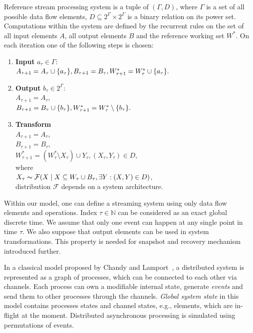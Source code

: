 \begin{definition}{Reference stream processing system}
\label{reference_system}
is a tuple of $(\Gamma,D)$, where $\Gamma$ is a set of all possible data flow elements, $D\subseteq{2^{\Gamma}\times2^{\Gamma}}$ is a binary relation on its power set. Computations within the system are defined by the recurrent rules on the set of all input elements $A$, all output elements $B$ and the reference working set $W^{*}$. On each iteration one of the following steps is chosen:

\begin{enumerate}
    \item \textbf{Input} $a_\tau\in{\Gamma}$:\\ $A_{\tau+1}=A_\tau \cup \{a_\tau\}, \\ B_{\tau+1}=B_{\tau}, \\ W^{*}_{\tau+1}=W^{*}_{\tau} \cup \{a_\tau\}.$
    \item \textbf{Output} $b_\tau\in{2^\Gamma}$:\\ $A_{\tau + 1} = A_{\tau}$, \\ $B_{\tau+1}=B_\tau \cup \{b_\tau\}, \\ W^{*}_{\tau+1}=W^{*}_{\tau} \setminus \{b_\tau\}.$
    \item \textbf{Transform}\\ $A_{\tau + 1} = A_{\tau}$,\\ $B_{\tau+1}=B_{\tau}$, \\ $W^{*}_{\tau+1}=(W^{*}_\tau \setminus X_\tau) \cup Y_\tau, (X_\tau,Y_\tau) \in D$, \\where\\$X_\tau \thicksim \mathcal{F}(X\mid X \subseteq W_\tau \cup B_\tau , \exists Y : (X,Y) \in D)$, \\ distribution $\mathcal{F}$ depends on a system architecture. \label{random_formula}
\end{enumerate}

\end{definition}

Within our model, one can define a streaming system using only data flow elements and operations. Index $\tau\in{\mathbb{N}}$ can be considered as an exact global discrete time. We assume that only one event can happen at any single point in time $\tau$. We also suppose that output elements can be used in system transformations. This property is needed for snapshot and recovery mechanism introduced further. 

In a classical model proposed by Chandy and Lamport~\cite{Chandy:1985:DSD:214451.214456}, a distributed system is represented as a graph of processes, which can be connected to each other via channels. Each process can own a modifiable internal state, generate {\em events} and send them to other processes through the channels. {\em Global system state} in this model contains processes states and channel states, e.g., elements, which are in-flight at the moment. Distributed asynchronous processing is simulated using permutations of events.

